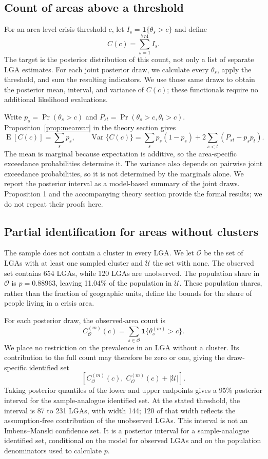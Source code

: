 \subsection{Count of areas above a threshold}

For an area-level crisis threshold \(c\), let \(I_s=\mathbf{1}\{\theta_s>c\}\) and define
\[
  C(c)=\sum_{s=1}^{774} I_s .
\]
The target is the posterior distribution of this count, not only a list of separate LGA estimates. For each joint posterior draw, we calculate every \(\theta_s\), apply the threshold, and sum the resulting indicators. We use those same draws to obtain the posterior mean, interval, and variance of \(C(c)\); these functionals require no additional likelihood evaluations.

Write \(p_s=\Pr(\theta_s>c)\) and \(P_{st}=\Pr(\theta_s>c,\theta_t>c)\). Proposition~\ref{prop:meanvar} in the theory section gives
\[
  \operatorname{E}[C(c)] = \sum_s p_s,\qquad
  \operatorname{Var}\{C(c)\}
  = \sum_s p_s(1-p_s)
    + 2\sum_{s<t}\left(P_{st}-p_sp_t\right).
\]
The mean is marginal because expectation is additive, so the area-specific exceedance probabilities determine it. The variance also depends on pairwise joint exceedance probabilities, so it is not determined by the marginals alone. We report the posterior interval as a model-based summary of the joint draws. Proposition 1 and the accompanying theory section provide the formal results; we do not repeat their proofs here.

\subsection{Partial identification for areas without clusters}

The sample does not contain a cluster in every LGA. We let \(\mathcal{O}\) be the set of LGAs with at least one sampled cluster and \(\mathcal{U}\) the set with none. The observed set contains 654 LGAs, while 120 LGAs are unobserved. The population share in \(\mathcal{O}\) is \(p=0.88963\), leaving 11.04\% of the population in \(\mathcal{U}\). These population shares, rather than the fraction of geographic units, define the bounds for the share of people living in a crisis area.

For each posterior draw, the observed-area count is
\[
  C_{\mathcal{O}}^{(m)}(c)
  = \sum_{s\in\mathcal{O}}
      \mathbf{1}\{\theta_s^{(m)}>c\}.
\]
We place no restriction on the prevalence in an LGA without a cluster. Its contribution to the full count may therefore be zero or one, giving the draw-specific identified set
\[
  \left[
    C_{\mathcal{O}}^{(m)}(c),\;
    C_{\mathcal{O}}^{(m)}(c)+|\mathcal{U}|
  \right].
\]
Taking posterior quantiles of the lower and upper endpoints gives a 95\% posterior interval for the sample-analogue identified set. At the stated threshold, the interval is 87 to 231 LGAs, with width 144; 120 of that width reflects the assumption-free contribution of the unobserved LGAs. This interval is not an Imbens--Manski confidence set. It is a posterior interval for a sample-analogue identified set, conditional on the model for observed LGAs and on the population denominators used to calculate \(p\).

